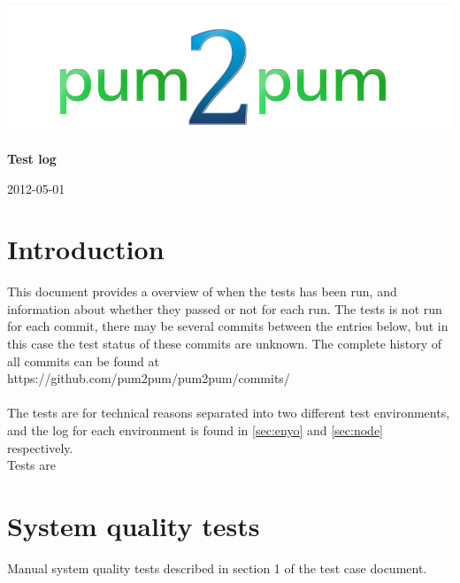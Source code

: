 \documentclass[a4paper, 12pt, titlepage]{article}
\begin{document}
	
	\begin{titlepage}
		
		\includegraphics[scale=0.4]{logoNormal.png}
		
		\vspace{6cm}
		
		\begin{center}
			\Huge{\textbf{Test log}} %
			
			\vspace{0.5cm}
			
			\huge{2012-05-01} %
		\end{center}
		
	\end{titlepage}
	
	\newpage


	\section{Introduction}
	This document provides a overview of when the tests has been run, and  information about whether they passed or not for each run. The tests is not run for each commit, there may be several commits between the entries below, but in this case the test status of these commits are unknown. The complete history of all commits can be found at\\

	https://github.com/pum2pum/pum2pum/commits/\\\\
	The tests are for technical reasons separated into two different test environments, and the log for each environment is found in \autoref{sec:enyo} and \autoref{sec:node} respectively.\\

	Tests are 


	\section{System quality tests}
	\label{sec:quality}
	Manual system quality tests described in section 1 of the test case document.\\
\end{document}
